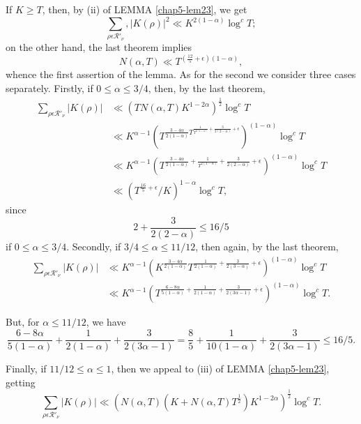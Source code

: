 If $K \geq T$, then, by (ii) of LEMMA \ref{chap5-lem23}, we get 
$$
  \sum_{\rho \epsilon  \mathscr{R'}_{\nu}}, |K (\rho)|^2 \ll K^{2
    (1-\alpha)} \log^c T ; 
$$
on the other hand, the last theorem implies
\begin{equation*}
  N(\alpha, T) \ll T^{\left(\frac{12}{5} + \epsilon  \right) (1 -
    \alpha)}, \tag{5.1.18} \label{eq5.1.18}
\end{equation*}\pageoriginale
whence the first assertion of the lemma.  As for the second we
consider three cases separately.  Firstly, if $0 \leq \alpha \leq
3/4$, then, by the last theorem,  
\begin{align*}
  \sum_{\rho \epsilon  \mathscr{R'}_\nu} |K (\rho)|  & \ll \left(TN
  (\alpha,  T) K ^{1-2\alpha}\right)^{\frac{1}{2}}\log^c T\\ 
  & \ll K^{\alpha -1}\left(T^{\frac{3 - 4 \alpha}{2 (1-\alpha)}
      T^{\frac{1}{T^{2 (1-\alpha)}}+ \frac{3}{2(2-\alpha)} +
      \epsilon }}\right)^{(1-\alpha) } \log ^c T\\ 
  & \ll K^{\alpha -1}\left(T^{\frac{3 - 4 \alpha}{2 (1-\alpha)}+
      \frac{1}{T^{2 (1-\alpha)}}+ \frac{3}{2(2-\alpha)} +
      \epsilon} \right)^{(1-\alpha) } \log ^c T\\ 
  & \ll \left(T^{\frac{16}{5}+\epsilon }/K\right)^{1-\alpha} \log^c T,
\end{align*}
since 
$$
2 + \frac{3}{2(2 -\alpha)} \leq 16/5
$$
if $0 \leq \alpha \leq 3/4$. Secondly,  if $3/4 \leq \alpha \leq
11/12$, then again, by the last theorem, 
\begin{align*}
  \sum_{\rho \epsilon  \mathscr{R}'_\nu} | K(\rho) | & \ll  K^{\alpha
    -1} \left(K^{\frac{3 - 4 \alpha}{2 (1-\alpha)}}T^{\frac{1}{2
        (1-\alpha)}+ \frac{3}{2(3-\alpha)} +
    \epsilon }\right)^{(1-\alpha) } \log ^c T\\ 
  & \ll K^{\alpha -1} \left(T^{\frac{6 - 8 \alpha}{5(1-\alpha )}+
      \frac{1}{2(1-\alpha)}+ \frac{3}{2(3\alpha-1)} +
    \epsilon }\right)^{(1-\alpha ) } \log^c T. 
\end{align*}

But, for $\alpha \leq 11/12$, we have
$$
\frac{6-8\alpha}{5(1-\alpha)} + \frac{1}{2(1-\alpha)} +
\frac{3}{2(3\alpha -1)} = \frac{8}{5}+ \frac{1}{10(1-\alpha)} +
\frac{3}{2(3 \alpha -1)} \leq 16/5. 
$$

Finally, if $11/12\leq \alpha \leq 1$, then we appeal to (iii) of
LEMMA \ref{chap5-lem23}, getting\pageoriginale 
$$
\sum_{\rho \epsilon  \mathscr{R}'_\nu} |K(\rho)| \ll (N (\alpha,  T)
(K + N (\alpha,  T) T ^{\frac{1}{2}}) K^{1-2\alpha})^{\frac{1}{2}}
\log^c T. 
$$

